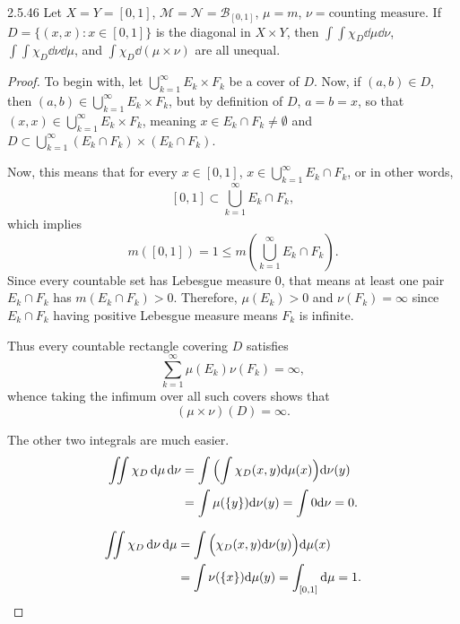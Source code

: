 \documentclass[11pt]{article}
\begin{document}
\begin{problem}{2.5.46}
  Let \( X = Y = [0,1] \), \( \mathcal{M} = \mathcal{N} = \mathcal{B}_{[0,1]} \), \( \mu = m \), \( \nu = \text{counting measure} \).
  If \( D = \{(x,x) : x \in [0,1]\} \) is the diagonal in \( X \times Y \), then \( \int \int \chi_D \dd{\mu} \dd{\nu} \), \( \int \int \chi_D \dd{\nu}\dd{\mu} \), and \( \int \chi_D \dd{(\mu \times \nu)} \) are all unequal.
\end{problem}
\begin{proof}
  To begin with, let \( \bigcup_{k=1}^{\infty} E_k \times F_{k} \) be a cover of \( D \).
  Now, if \( (a,b) \in D \), then \( (a,b) \in \bigcup_{k=1}^{\infty} E_k \times F_k \), but by definition of \( D \), \( a = b = x \), so that \( (x,x) \in \bigcup_{k=1}^{\infty} E_k \times F_k \), meaning \( x \in E_k \cap F_k \neq \emptyset \) and \( D \subset \bigcup_{k=1}^{\infty} (E_k \cap F_k) \times (E_k \cap F_k) \).

  Now, this means that for every \( x \in [0,1] \), \( x \in \bigcup_{k=1}^{\infty} E_k \cap F_k \), or in other words,
  \begin{equation}
  \label{eq:6}
  [0,1] \subset \bigcup_{k=1}^{\infty} E_k \cap F_k,
\end{equation}
which implies
\begin{equation}
\label{eq:7}
m([0,1]) = 1 \leq m(\bigcup_{k=1}^{\infty} E_k \cap F_k).
\end{equation}
Since every countable set has Lebesgue measure \( 0 \), that means at least one pair \( E_k \cap F_k \) has \( m(E_k \cap F_k) > 0 \).
Therefore, \(\mu(E_k) > 0\) and \( \nu(F_k) = \infty \) since \( E_k \cap F_k \) having positive Lebesgue measure means \( F_k \) is infinite.

Thus every countable rectangle covering \( D \) satisfies
\begin{equation}
\label{eq:27}
\sum\limits_{k=1}^{\infty} \mu(E_k)\nu(F_k) = \infty,
\end{equation}
whence taking the infimum over all such covers shows that
\begin{equation}
\label{eq:28}
(\mu \times \nu)(D) = \infty.
\end{equation}

The other two integrals are much easier.
\begin{equation}
\label{eq:9}
\begin{aligned}
  \iint \chi_D \dd{\mu} \dd{\nu} &= \int \qty\Big(\int\chi_D(x,y) \dd\mu(x)) \dd\nu(y) \\
  &= \int \mu(\{y\}) \dd\nu(y) = \int 0 \dd\nu = 0.
\end{aligned}
\end{equation}

\begin{equation}
\label{eq:10}
\begin{aligned}
  \iint \chi_D \dd{\nu}\dd{\mu} &= \int \qty\Big(\chi_D(x,y) \dd\nu(y)) \dd\mu(x) \\
  &= \int \nu(\{x\}) \dd\mu(y) = \int_{[0,1]} \dd\mu = 1.
\end{aligned}
\end{equation}
\end{proof}
\end{document}
